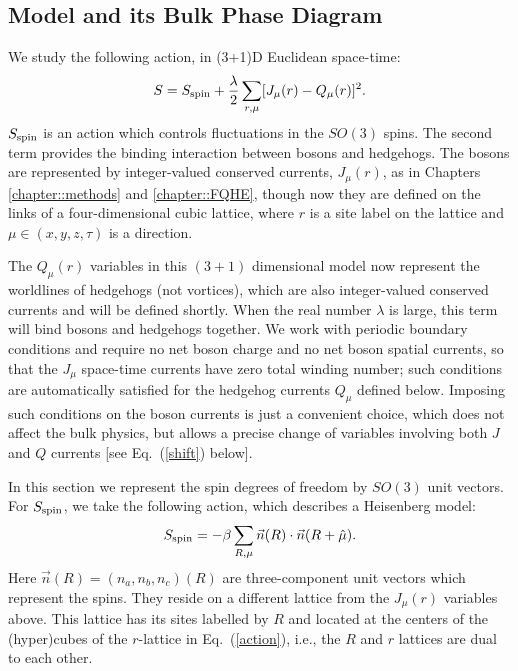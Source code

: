 \subsection{Model and its Bulk Phase Diagram}
\label{subsec::bulkheis}
We study the following action, in (3+1)D Euclidean space-time:
\begin{equation}
S=S_{\rm spin}+\frac{\lambda}{2}\sum_{r,\mu} [ J_\mu(r)- Q_\mu(r)]^2.
\label{action}
\end{equation}
$S_{\rm spin}$ is an action which controls fluctuations in the $SO(3)$ spins. The second term provides the binding interaction between bosons and hedgehogs. 
The bosons are represented by integer-valued conserved currents, $J_\mu(r)$, as in Chapters \ref{chapter::methods} and \ref{chapter::FQHE}, though now they are defined on the links of a four-dimensional cubic lattice, where $r$ is a site label on the lattice and $\mu\in (x,y,z,\tau)$ is a direction. 

The $Q_\mu(r)$ variables in this $(3+1)$ dimensional model now represent the worldlines of hedgehogs (not vortices), which are also integer-valued conserved currents and will be defined shortly.  When the real number $\lambda$ is large, this term will bind bosons and hedgehogs together. We work with periodic boundary conditions and require no net boson charge and no net boson spatial currents, so that the $J_\mu$ space-time currents have zero total winding number; such conditions are automatically satisfied for the hedgehog currents $Q_\mu$ defined below.  Imposing such conditions on the boson currents is just a convenient choice, which does not affect the bulk physics, but allows a precise change of variables involving both $J$ and $Q$ currents [see Eq.~(\ref{shift}) below].

In this section we represent the spin degrees of freedom by $SO(3)$ unit vectors. For $S_{\rm spin}$, we take the following action, which describes a Heisenberg model:
\begin{equation}
S_{\rm spin}=-\beta\sum_{R,\mu} \vec{n}(R)\cdot \vec{n}(R+\hat{\mu}).
\label{SHeis}
\end{equation}
Here $\vec{n}(R)=(n_a,n_b,n_c)(R)$ are three-component unit vectors which represent the spins. They reside on a different lattice from the $J_\mu(r)$ variables above. This lattice has its sites labelled by $R$ and located at the centers of the (hyper)cubes of the $r$-lattice in Eq.~(\ref{action}), i.e., the $R$ and $r$ lattices are dual to each other.

